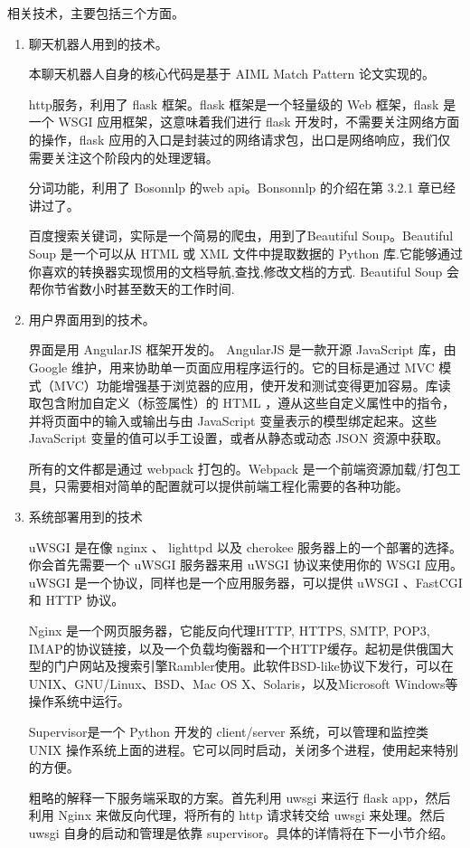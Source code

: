\documentclass[bachelor,winfonts]{jnuthesis}
\begin{document}
相关技术，主要包括三个方面。

\begin{enumerate}
\item 聊天机器人用到的技术。

本聊天机器人自身的核心代码是基于 AIML Match Pattern 论文\cite{aiml-match-pattern}实现的。

http服务，利用了 flask 框架。flask 框架是一个轻量级的 Web 框架，flask 是一个 WSGI 应用框架，这意味着我们进行 flask 开发时，不需要关注网络方面的操作，flask 应用的入口是封装过的网络请求包，出口是网络响应，我们仅需要关注这个阶段内的处理逻辑。

分词功能，利用了 Bosonnlp 的web api。Bonsonnlp 的介绍在第 3.2.1 章已经讲过了。

百度搜索关键词，实际是一个简易的爬虫，用到了Beautiful Soup。Beautiful Soup 是一个可以从 HTML 或 XML 文件中提取数据的 Python 库.它能够通过你喜欢的转换器实现惯用的文档导航,查找,修改文档的方式. Beautiful Soup 会帮你节省数小时甚至数天的工作时间.

\item 用户界面用到的技术。

界面是用 AngularJS 框架开发的。 AngularJS 是一款开源 JavaScript 库，由 Google 维护，用来协助单一页面应用程序运行的。它的目标是通过 MVC 模式（MVC）功能增强基于浏览器的应用，使开发和测试变得更加容易。库读取包含附加自定义（标签属性）的 HTML ，遵从这些自定义属性中的指令，并将页面中的输入或输出与由 JavaScript 变量表示的模型绑定起来。这些 JavaScript 变量的值可以手工设置，或者从静态或动态 JSON 资源中获取。

所有的文件都是通过 webpack 打包的。Webpack 是一个前端资源加载/打包工具，只需要相对简单的配置就可以提供前端工程化需要的各种功能。

\item 系统部署用到的技术

uWSGI 是在像 nginx 、 lighttpd 以及 cherokee 服务器上的一个部署的选择。你会首先需要一个 uWSGI 服务器来用 uWSGI 协议来使用你的 WSGI 应用。 uWSGI 是一个协议，同样也是一个应用服务器，可以提供 uWSGI 、FastCGI 和 HTTP 协议。

Nginx 是一个网页服务器，它能反向代理HTTP, HTTPS, SMTP, POP3, IMAP的协议链接，以及一个负载均衡器和一个HTTP缓存。起初是供俄国大型的门户网站及搜索引擎Rambler使用。此软件BSD-like协议下发行，可以在UNIX、GNU/Linux、BSD、Mac OS X、Solaris，以及Microsoft Windows等操作系统中运行。

Supervisor是一个 Python 开发的 client/server 系统，可以管理和监控类 UNIX 操作系统上面的进程。它可以同时启动，关闭多个进程，使用起来特别的方便。

粗略的解释一下服务端采取的方案。首先利用 uwsgi 来运行 flask app，然后利用 Nginx 来做反向代理，将所有的 http 请求转交给 uwsgi 来处理。然后 uwsgi 自身的启动和管理是依靠 supervisor。具体的详情将在下一小节介绍。


\end{enumerate}
\end{document}
